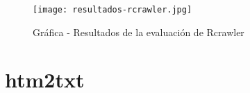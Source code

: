 \begin{figure}[tphb]
    \centering
    \texttt{[image: resultados-rcrawler.jpg]}
    \caption{Gráfica - Resultados de la evaluación de Rcrawler}
    \label{img:grafica - resultados de la evaluacion de rcrawler}
\end{figure}

\section*{htm2txt}

